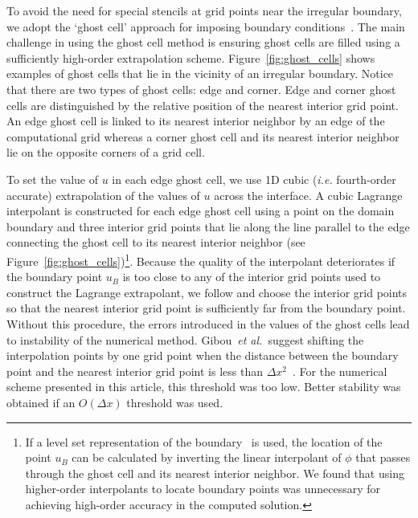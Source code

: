 \documentclass[fleqn,12pt,twoside]{article}
\def\dx{\Delta x}
\def\ie{\emph{i.e. }}
\def\etal{\emph{et al.}}
\begin{document}
To avoid the need for special stencils at grid points near the irregular 
boundary, we adopt the `ghost cell' approach for imposing boundary 
conditions~\cite{gibou_2005,ito_2005,fedkiw_1999,osher_fedkiw_book}.
The main challenge in using the ghost cell method is ensuring ghost cells 
are filled using a sufficiently high-order extrapolation scheme. 
Figure~\ref{fig:ghost_cells} shows examples of ghost cells that lie in the 
vicinity of an irregular boundary.  Notice that there are two types of ghost 
cells:  edge and corner.  Edge and corner ghost cells are distinguished by 
the relative position of the nearest interior grid point.  An edge ghost cell 
is linked to its nearest interior neighbor by an edge of the computational 
grid whereas a corner ghost cell and its nearest interior neighbor lie on the 
opposite corners of a grid cell.

To set the value of $u$ in each edge ghost cell, we use 1D cubic 
(\ie fourth-order accurate) extrapolation of the values of $u$ across the 
interface.  A cubic Lagrange interpolant is constructed for each edge ghost 
cell using a point on the domain boundary and three interior grid points that 
lie along the line parallel to the edge connecting the ghost cell to its 
nearest interior neighbor (see Figure~\ref{fig:ghost_cells})\footnote{If
a level set representation of the boundary~\cite{osher_fedkiw_book} is used, 
the location of the point $u_B$ can be calculated by inverting the linear 
interpolant of $\phi$ that passes through the ghost cell and its nearest
interior neighbor.  We found that using higher-order interpolants to 
locate boundary points was unnecessary for achieving high-order accuracy in 
the computed solution.}.  Because the quality of the interpolant deteriorates 
if the boundary point $u_B$ is too close to any of the interior grid points 
used to construct the Lagrange extrapolant, we follow \cite{gibou_2005} and 
choose the interior grid points so that the nearest interior grid point is 
sufficiently far from the boundary point.  Without this procedure, the errors 
introduced in the values of the ghost cells lead to instability of the 
numerical method.
Gibou~\etal~suggest shifting the interpolation points by one grid point 
when the distance between the boundary point and the nearest interior grid 
point is less than $\dx^2$~\cite{gibou_2005}.  For the numerical scheme 
presented in this article, this threshold was too low.  Better stability was 
obtained if an $O(\dx)$ threshold was used.
\end{document}
